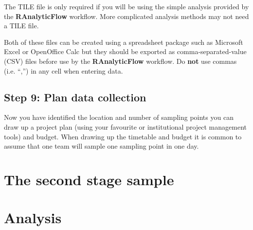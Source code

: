 \documentclass[12pt,a4paper]{book}
\theoremstyle{definition}
\theoremstyle{definition}
\theoremstyle{definition}
\theoremstyle{remark}
\begin{document}
The TILE file is only required if you will be using the simple analysis
provided by the \textbf{RAnalyticFlow} workflow. More complicated
analysis methods may not need a TILE file.

Both of these files can be created using a spreadsheet package such as
Microsoft Excel or OpenOffice Calc but they should be exported as
comma-separated-value (CSV) files before use by the
\textbf{RAnalyticFlow} workflow. Do \textbf{not} use commas (i.e. ``,'')
in any cell when entering data.

\hypertarget{step-9-plan-data-collection}{%
\section{Step 9: Plan data
collection}\label{step-9-plan-data-collection}}

Now you have identified the location and number of sampling points you
can draw up a project plan (using your favourite or institutional
project management tools) and budget. When drawing up the timetable and
budget it is common to assume that one team will sample one sampling
point in one day.

\hypertarget{stage2}{%
\chapter{The second stage sample}\label{stage2}}

\hypertarget{analysis}{%
\chapter{Analysis}\label{analysis}}


\end{document}
